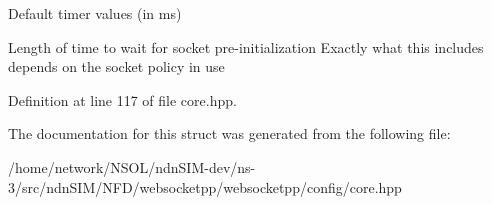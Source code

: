 Default timer values (in ms) 

Length of time to wait for socket pre-\/initialization Exactly what this includes depends on the socket policy in use 

Definition at line 117 of file core.\+hpp.



The documentation for this struct was generated from the following file\+:\begin{DoxyCompactItemize}
\item 
/home/network/\+N\+S\+O\+L/ndn\+S\+I\+M-\/dev/ns-\/3/src/ndn\+S\+I\+M/\+N\+F\+D/websocketpp/websocketpp/config/core.\+hpp\end{DoxyCompactItemize}
